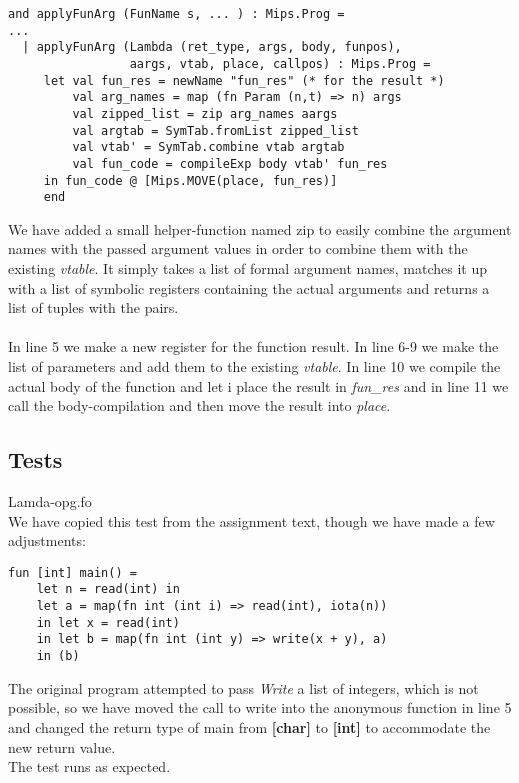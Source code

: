 \documentclass{article}
\begin{document}
\begin{lstlisting}
and applyFunArg (FunName s, ... ) : Mips.Prog =
...
  | applyFunArg (Lambda (ret_type, args, body, funpos),
                 aargs, vtab, place, callpos) : Mips.Prog =
     let val fun_res = newName "fun_res" (* for the result *)
         val arg_names = map (fn Param (n,t) => n) args
         val zipped_list = zip arg_names aargs
         val argtab = SymTab.fromList zipped_list
         val vtab' = SymTab.combine vtab argtab
         val fun_code = compileExp body vtab' fun_res            
     in fun_code @ [Mips.MOVE(place, fun_res)]
     end
\end{lstlisting}
\noindent We have added a small helper-function named zip to easily combine the argument names with the passed argument values in order to combine them with the existing \textit{vtable}. It simply takes a list of formal argument names, matches it up with a list of symbolic registers containing the actual arguments and returns a list of tuples with the pairs.\\
\\
\noindent In line 5 we make a new register for the function result. In line 6-9 we make the list of parameters and add them to the existing \textit{vtable}. In line 10 we compile the actual body of the function and let i place the result in \textit{fun\_res} and in line 11 we call the body-compilation and then move the result into \textit{place}.

\subsection{Tests}

Lamda-opg.fo\\
We have copied this test from the assignment text, though we have made a few adjustments:
\begin{lstlisting}
fun [int] main() = 
	let n = read(int) in 
	let a = map(fn int (int i) => read(int), iota(n)) 
	in let x = read(int) 
	in let b = map(fn int (int y) => write(x + y), a) 
	in (b)
\end{lstlisting}
\noindent The original program attempted to pass \textit{Write} a list of integers, which is not possible, so we have moved the call to write into the anonymous function in line 5 and changed the return type of main from \textbf{[char]} to \textbf{[int]} to accommodate the new return value.\\
The test runs as expected.

\newpage
\end{document}
